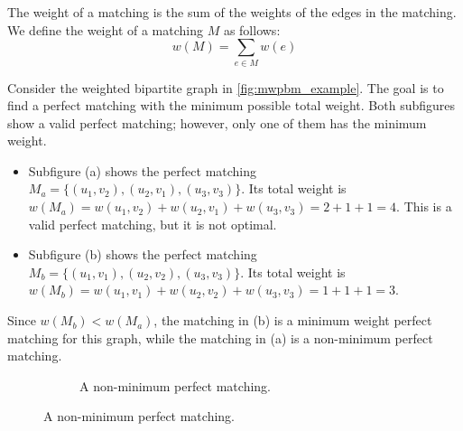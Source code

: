 The weight of a matching is the sum of the weights of the edges in the matching. We define the weight of a matching $M$ as follows:
\begin{equation}
    w(M) = \sum_{e \in M} w(e)
\end{equation}

\begin{example}
    Consider the weighted bipartite graph in \cref{fig:mwpbm_example}. The goal is to find a perfect matching with the minimum possible total weight. Both subfigures show a valid perfect matching; however, only one of them has the minimum weight.
    \begin{itemize}
        \item Subfigure (a) shows the perfect matching $M_a = \{(u_1, v_2), (u_2, v_1), (u_3, v_3)\}$. Its total weight is $w(M_a) = w(u_1, v_2) + w(u_2, v_1) + w(u_3, v_3) = 2 + 1 + 1 = 4$. This is a valid perfect matching, but it is not optimal.
        \item Subfigure (b) shows the perfect matching $M_b = \{(u_1, v_1), (u_2, v_2), (u_3, v_3)\}$. Its total weight is $w(M_b) = w(u_1, v_1) + w(u_2, v_2) + w(u_3, v_3) = 1 + 1 + 1 = 3$.
    \end{itemize}
    Since $w(M_b) < w(M_a)$, the matching in (b) is a minimum weight perfect matching for this graph, while the matching in (a) is a non-minimum perfect matching.
    \begin{figure}[H]
        \centering
        \begin{subfigure}[b]{0.45\textwidth}
            \centering
            \caption{A non-minimum perfect matching.}
            \label{fig:mwpbm_non_perfect}
        \end{subfigure}

\end{figure}
\end{example}
